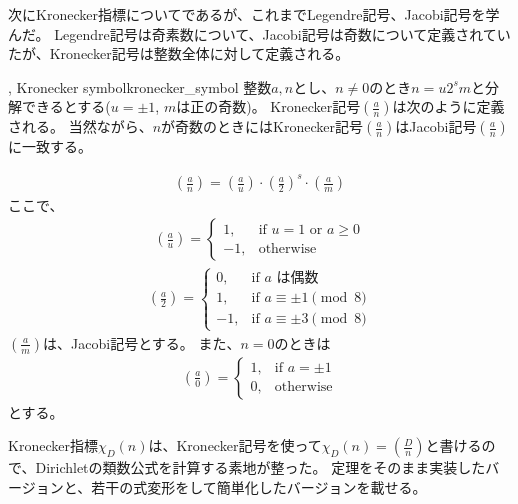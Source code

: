 次にKronecker指標についてであるが、これまでLegendre記号、Jacobi記号を学んだ。
Legendre記号は奇素数について、Jacobi記号は奇数について定義されていたが、Kronecker記号は整数全体に対して定義される。

\begin{Defi}{, Kronecker symbol}{kronecker_symbol}
整数$a,n$とし、$n\neq0$のとき$n=u2^sm$と分解できるとする($u=\pm1$, $m$は正の奇数)。
Kronecker記号$\left(\frac{a}{n}\right)$は次のように定義される。
当然ながら、$n$が奇数のときにはKronecker記号$\left(\frac{a}{n}\right)$はJacobi記号$\left(\frac{a}{n}\right)$に一致する。

\begin{align*}
\left(\frac{a}{n}\right) = \left(\frac{a}{u}\right)\cdot \left(\frac{a}{2}\right)^s \cdot\left(\frac{a}{m}\right)
\end{align*}
ここで、
\begin{align*}
\left(\frac{a}{u}\right) = 
\begin{cases}
1, & \mbox{if } u = 1 \mbox{ or } a \ge 0\\
-1, & \mbox{otherwise}
\end{cases}
\end{align*}
\begin{align*}
\left(\frac{a}{2}\right) = 
\begin{cases}
0, & \mbox{if } a \mbox{ は偶数}\\
1, & \mbox{if } a \equiv \pm 1 \pmod{8}\\
-1, & \mbox{if } a \equiv \pm 3 \pmod{8}
\end{cases}
\end{align*}
$\left(\frac{a}{m}\right)$は、Jacobi記号とする。
また、$n=0$のときは
\begin{align*}
\left(\frac{a}{0}\right) = 
\begin{cases}
1, & \mbox{if } a = \pm 1\\
0, & \mbox{otherwise}
\end{cases}
\end{align*}
とする。
\end{Defi}


Kronecker指標$\chi_D(n)$は、Kronecker記号を使って$\chi_D(n)=\left(\frac{D}{n}\right)$と書けるので、Dirichletの類数公式を計算する素地が整った。
定理をそのまま実装したバージョンと、若干の式変形をして簡単化したバージョンを載せる。


